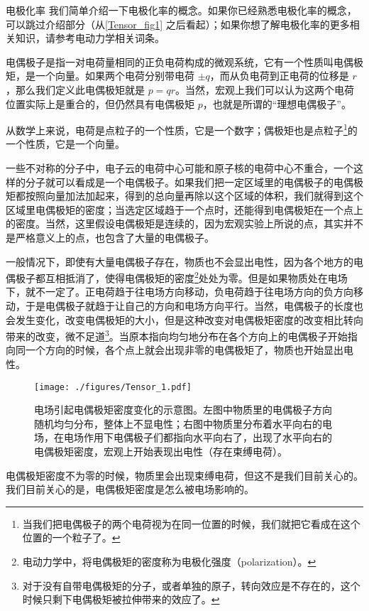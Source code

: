 \begin{example}{电极化率}
我们简单介绍一下电极化率的概念。如果你已经熟悉电极化率的概念，可以跳过介绍部分（从\autoref{Tensor_fig1} 之后看起）；如果你想了解电极化率的更多相关知识，请参考电动力学相关词条。

电偶极子是指一对电荷量相同的正负电荷构成的微观系统，它有一个性质叫电偶极矩，是一个向量。如果两个电荷分别带电荷 $\pm q$，而从负电荷到正电荷的位移是 ${r}$，那么我们定义此电偶极矩就是 ${p}=q{r}$。当然，宏观上我们可以认为这两个电荷位置实际上是重合的，但仍然具有电偶极矩 ${p}$，也就是所谓的“理想电偶极子”。

从数学上来说，电荷是点粒子的一个性质，它是一个数字；偶极矩也是点粒子\footnote{当我们把电偶极子的两个电荷视为在同一位置的时候，我们就把它看成在这个位置的一个粒子了。}的一个性质，它是一个向量。

一些不对称的分子中，电子云的电荷中心可能和原子核的电荷中心不重合，一个这样的分子就可以看成是一个电偶极子。如果我们把一定区域里的电偶极子的电偶极矩都按照向量加法加起来，得到的总向量再除以这个区域的体积，我们就得到这个区域里电偶极矩的密度；当选定区域趋于一个点时，还能得到电偶极矩在一个点上的密度。当然，这里假设电偶极矩是连续的，因为宏观实验上所说的点，其实并不是严格意义上的点，也包含了大量的电偶极子。

一般情况下，即使有大量电偶极子存在，物质也不会显出电性，因为各个地方的电偶极子都互相抵消了，使得电偶极矩的密度\footnote{电动力学中，将电偶极矩的密度称为电极化强度（polarization）。}处处为零。但是如果物质处在电场下，就不一定了。正电荷趋于往电场方向移动，负电荷趋于往电场方向的负方向移动，于是电偶极子就趋于让自己的方向和电场方向平行。当然，电偶极子的长度也会发生变化，改变电偶极矩的大小，但是这种改变对电偶极矩密度的改变相比转向带来的改变，微不足道\footnote{对于没有自带电偶极矩的分子，或者单独的原子，转向效应是不存在的，这个时候只剩下电偶极矩被拉伸带来的效应了。}。当原本指向均匀地分布在各个方向上的电偶极子开始指向同一个方向的时候，各个点上就会出现非零的电偶极矩了，物质也开始显出电性。

\begin{figure}[ht]
\centering
\texttt{[image: ./figures/Tensor\_1.pdf]}
\caption{电场引起电偶极矩密度变化的示意图。左图中物质里的电偶极子方向随机均匀分布，整体上不显电性；右图中物质里分布着水平向右的电场，在电场作用下电偶极子们都指向水平向右了，出现了水平向右的电偶极矩密度，宏观上开始表现出电性（存在束缚电荷）。} \label{Tensor_fig1}
\end{figure}

电偶极矩密度不为零的时候，物质里会出现束缚电荷，但这不是我们目前关心的。我们目前关心的是，电偶极矩密度是怎么被电场影响的。


\end{example}
